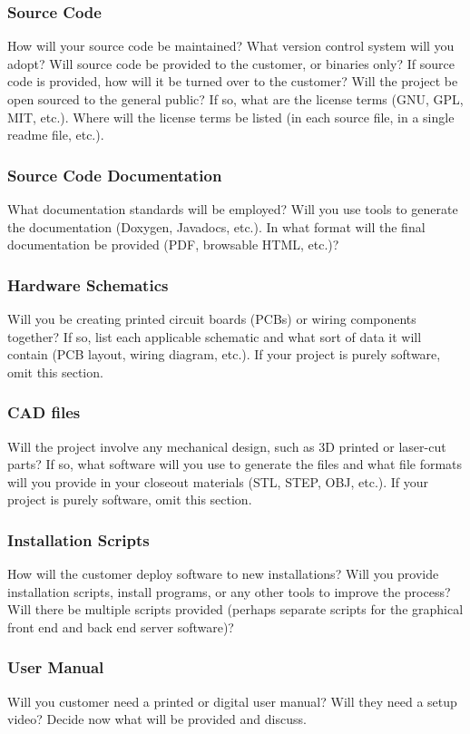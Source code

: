 \subsubsection{Source Code}
How will your source code be maintained? What version control system will you adopt? Will source code be provided to the customer, or binaries only? If source code is provided, how will it be turned over to the customer? Will the project be open sourced to the general public? If so, what are the license terms (GNU, GPL, MIT, etc.). Where will the license terms be listed (in each source file, in a single readme file, etc.).

\subsubsection{Source Code Documentation}
What documentation standards will be employed? Will you use tools to generate the documentation (Doxygen, Javadocs, etc.). In what format will the final documentation be provided (PDF, browsable HTML, etc.)?

\subsubsection{Hardware Schematics}
Will you be creating printed circuit boards (PCBs) or wiring components together? If so, list each applicable schematic and what sort of data it will contain (PCB layout, wiring diagram, etc.). If your project is purely software, omit this section.

\subsubsection{CAD files}
Will the project involve any mechanical design, such as 3D printed or laser-cut parts? If so, what software will you use to generate the files and what file formats will you provide in your closeout materials (STL, STEP, OBJ, etc.). If your project is purely software, omit this section.

\subsubsection{Installation Scripts}
How will the customer deploy software to new installations? Will you provide installation scripts, install programs, or any other tools to improve the process? Will there be multiple scripts provided (perhaps separate scripts for the graphical front end and back end server software)? 

\subsubsection{User Manual}
Will you customer need a printed or digital user manual? Will they need a setup video? Decide now what will be provided and discuss.
